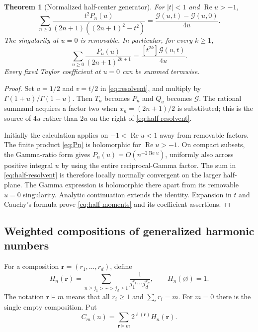 \documentclass[11pt,a4paper]{article}
\numberwithin{equation}{section}
\newtheorem{theorem}{Theorem}[section]
\theoremstyle{definition}\newtheorem{definition}[theorem]{Definition}
\theoremstyle{remark}\newtheorem{remark}[theorem]{Remark}
\newcommand{\Gcal}{\mathcal G}\newcommand{\Rcal}{\mathcal R}
\newcommand{\Repart}{\operatorname{Re}}
\begin{document}
\begin{theorem}[Normalized half-center generator]
\label{thm:half-generator}
For $|t|<1$ and $\Repart u>-1$,
\begin{equation}
 \sum_{n\ge0}\frac{t^2P_n(u)}{(2n+1)((2n+1)^2-t^2)}
       =\frac{\Gcal(u,t)-\Gcal(u,0)}{4u}.
 \label{eq:half-resolvent}
\end{equation}
The singularity at $u=0$ is removable. In particular, for every $k\ge1$,
\begin{equation}
 \sum_{n\ge0}\frac{P_n(u)}{(2n+1)^{2k+1}}
       =\frac{[t^{2k}]\Gcal(u,t)}{4u}.
 \label{eq:half-moments}
\end{equation}
Every fixed Taylor coefficient at $u=0$ can be summed termwise.
\end{theorem}
\begin{proof}
Set $a=1/2$ and $v=t/2$ in \eqref{eq:resolvent}, and multiply by
$\Gamma(1+u)/\Gamma(1-u)$. Then $T_n$ becomes $P_n$ and $Q_a$
becomes $\Gcal$. The rational summand acquires a factor two when
$x_n=(2n+1)/2$ is substituted; this is the source of $4u$ rather
than $2u$ on the right of \eqref{eq:half-resolvent}.

Initially the calculation applies on $-1<\Repart u<1$ away from
removable factors. The finite product \eqref{eq:Pn} is holomorphic
for $\Repart u>-1$. On compact subsets, the Gamma-ratio form gives
$P_n(u)=O(n^{-2\Repart u})$, uniformly also across positive integral
$u$ by using the entire reciprocal-Gamma factor. The sum in
\eqref{eq:half-resolvent} is therefore locally normally convergent
on the larger half-plane. The Gamma expression is holomorphic there
apart from its removable $u=0$ singularity. Analytic continuation
extends the identity. Expansion in $t$ and Cauchy's formula prove
\eqref{eq:half-moments} and its coefficient assertions.
\end{proof}

\subsection{Weighted compositions of generalized harmonic numbers}
For a composition $\mathbf r=(r_1,\ldots,r_d)$, define
\begin{equation}
 H_n(\mathbf r)=\sum_{n\ge j_1>\cdots>j_d\ge1}
                   \frac1{j_1^{r_1}\cdots j_d^{r_d}},
 \qquad H_n(\varnothing)=1.
 \label{eq:strict-H}
\end{equation}
The notation $\mathbf r\vDash m$ means that all $r_i\ge1$ and
$\sum_i r_i=m$. For $m=0$ there is the single empty composition.
Put
\begin{equation}
 C_m(n)=\sum_{\mathbf r\vDash m}2^{\ell(\mathbf r)}H_n(\mathbf r).
 \label{eq:Cm}
\end{equation}
\end{document}
